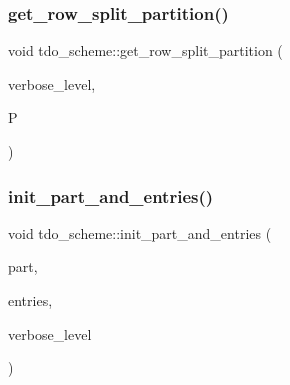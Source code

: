 \subsubsection{\texorpdfstring{get\+\_\+row\+\_\+split\+\_\+partition()}{get\_row\_split\_partition()}}
{\footnotesize\ttfamily void tdo\+\_\+scheme\+::get\+\_\+row\+\_\+split\+\_\+partition (\begin{DoxyParamCaption}\item[{\mbox{\hyperlink{galois_8h_a09fddde158a3a20bd2dcadb609de11dc}{I\+NT}}}]{verbose\+\_\+level,  }\item[{\mbox{\hyperlink{classpartitionstack}{partitionstack}} \&}]{P }\end{DoxyParamCaption})}

\mbox{\label{classtdo__scheme_ac5a97ae486a59bc883eb1ead1c6fd9b4}} 
\subsubsection{\texorpdfstring{init\+\_\+part\+\_\+and\+\_\+entries()}{init\_part\_and\_entries()}}
{\footnotesize\ttfamily void tdo\+\_\+scheme\+::init\+\_\+part\+\_\+and\+\_\+entries (\begin{DoxyParamCaption}\item[{\mbox{\hyperlink{galois_8h_a09fddde158a3a20bd2dcadb609de11dc}{I\+NT}} $\ast$}]{part,  }\item[{\mbox{\hyperlink{galois_8h_a09fddde158a3a20bd2dcadb609de11dc}{I\+NT}} $\ast$}]{entries,  }\item[{\mbox{\hyperlink{galois_8h_a09fddde158a3a20bd2dcadb609de11dc}{I\+NT}}}]{verbose\+\_\+level }\end{DoxyParamCaption})}

\mbox{\label{classtdo__scheme_aa2b76681ac4c2cba7aeeb0ce2c231450}} 
